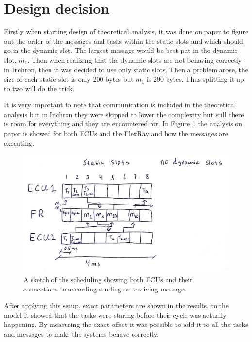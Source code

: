 \section{Design decision}
Firstly when starting design of theoretical analysis, it was done on paper to figure out the order of the messages and tasks within the static slots and which should go in the dynamic slot. The largest message would be best put in the dynamic slot, $m_1$. Then when realizing that the dynamic slots are not behaving correctly in Inchron, then it was decided to use only static slots. Then a problem arose, the size of each static slot is only 200 bytes but $m_1$ is 290 bytes. Thus splitting it up to two will do the trick.

It is very important to note that communication is included in the theoretical analysis but in Inchron they were skipped to lower the complexity but still there is room for everything and they are encountered for. In Figure \ref{fig:FRdrawing} the analysis on paper is showed for both ECUs and the FlexRay and how the messages are executing.
\begin{figure}[h!]
	\begin{center}
		\includegraphics[width=0.9\linewidth]{img/FR-drawing-2}
		\caption{A sketch of the scheduling showing both ECUs and their connections to according sending or receiving messages}
		\label{fig:FRdrawing}
	\end{center}
\end{figure}

After applying this setup, exact parameters are shown in the results, to the model it showed that the tasks were staring before their cycle was actually happening. By measuring the exact offset it was possible to add it to all the tasks and messages to make the systems behave correctly. 

